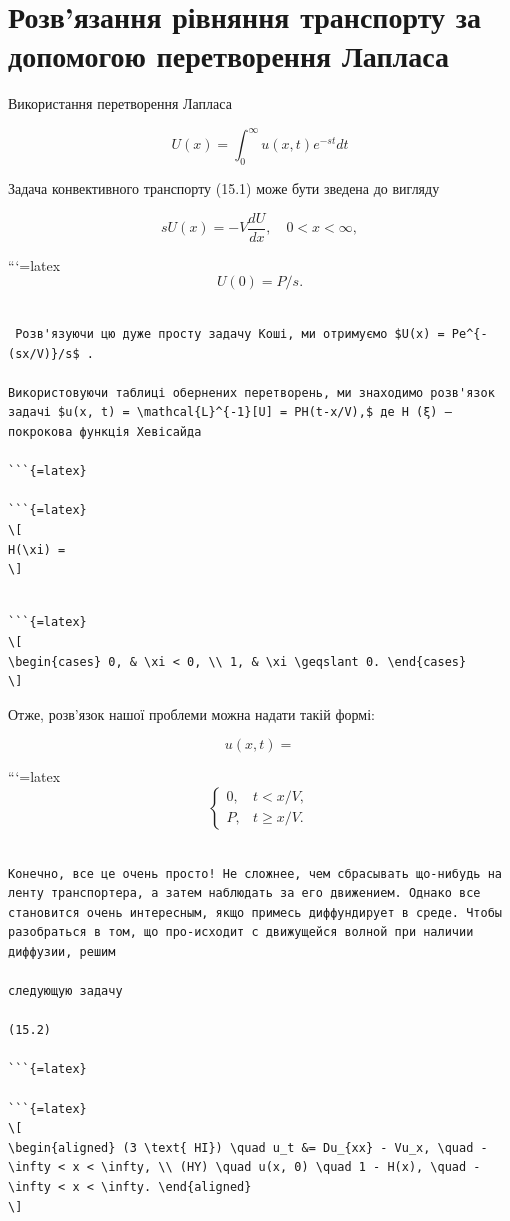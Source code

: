\documentclass[
]{article}
\begin{document}
\section{Розв'язання рівняння транспорту за допомогою перетворення
Лапласа}\label{ux440ux43eux437ux432ux44fux437ux430ux43dux43dux44f-ux440ux456ux432ux43dux44fux43dux43dux44f-ux442ux440ux430ux43dux441ux43fux43eux440ux442ux443-ux437ux430-ux434ux43eux43fux43eux43cux43eux433ux43eux44e-ux43fux435ux440ux435ux442ux432ux43eux440ux435ux43dux43dux44f-ux43bux430ux43fux43bux430ux441ux430}

Використання перетворення Лапласа

\[
U(x) = \int_{0}^{\infty} u(x, t) e^{-st} dt
\]

Задача конвективного транспорту (15.1) може бути зведена до вигляду

\[
sU(x) = -V \frac{dU}{dx}, \quad 0 < x < \infty,
\]

```{=latex}
\[
U(0) = P/s.
\]

\begin{verbatim}

 Розв'язуючи цю дуже просту задачу Коші, ми отримуємо $U(x) = Pe^{-(sx/V)}/s$ .

Використовуючи таблиці обернених перетворень, ми знаходимо розв'язок задачі $u(x, t) = \mathcal{L}^{-1}[U] = PH(t-x/V),$ де H (ξ) — покрокова функція Хевісайда

```{=latex}

```{=latex}
\[
H(\xi) =
\]
\end{verbatim}

\begin{verbatim}

```{=latex}
\[
\begin{cases} 0, & \xi < 0, \\ 1, & \xi \geqslant 0. \end{cases}
\]
\end{verbatim}

Отже, розв'язок нашої проблеми можна надати такій формі:

\[
u(x, t) =
\]

```{=latex}
\[
\begin{cases} 0, & t < x/V, \\ P, & t \ge x/V. \end{cases}
\]

\begin{verbatim}

Конечно, все це очень просто! Не сложнее, чем сбрасывать що-нибудь на ленту транспортера, а затем наблюдать за его движением. Однако все становится очень интересным, якщо примесь диффундирует в среде. Чтобы разобраться в том, що про-исходит с движущейся волной при наличии диффузии, решим

следующую задачу

(15.2)

```{=latex}

```{=latex}
\[
\begin{aligned} (3 \text{ HI}) \quad u_t &= Du_{xx} - Vu_x, \quad -\infty < x < \infty, \\ (HY) \quad u(x, 0) \quad 1 - H(x), \quad -\infty < x < \infty. \end{aligned}
\]
\end{verbatim}
\end{document}
